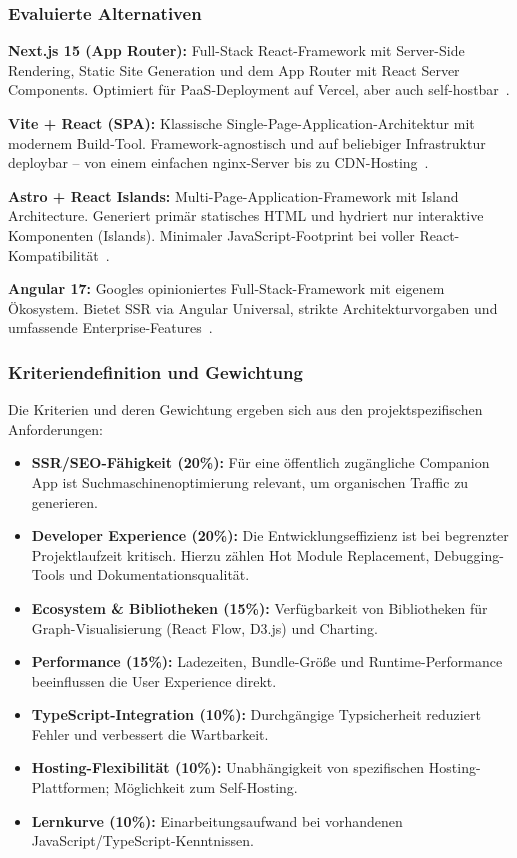 \subsubsection{Evaluierte Alternativen}

\textbf{Next.js 15 (App Router):} Full-Stack React-Framework mit Server-Side Rendering, Static Site Generation und dem App Router mit React Server Components. Optimiert für \ac{PaaS}-Deployment auf Vercel, aber auch self-hostbar~\cite{nextjsdocs2024}.

\textbf{Vite + React (SPA):} Klassische Single-Page-Application-Architektur mit modernem Build-Tool. Framework-agnostisch und auf beliebiger Infrastruktur deploybar – von einem einfachen nginx-Server bis zu \ac{CDN}-Hosting~\cite{vite2024}.

\textbf{Astro + React Islands:} Multi-Page-Application-Framework mit Island Architecture. Generiert primär statisches HTML und hydriert nur interaktive Komponenten (\glqq Islands\grqq{}). Minimaler JavaScript-Footprint bei voller React-Kompatibilität~\cite{astro2024}.

\textbf{Angular 17:} Googles opinioniertes Full-Stack-Framework mit eigenem Ökosystem. Bietet SSR via Angular Universal, strikte Architekturvorgaben und umfassende Enterprise-Features~\cite{angular2024}.

\subsubsection{Kriteriendefinition und Gewichtung}

Die Kriterien und deren Gewichtung ergeben sich aus den projektspezifischen Anforderungen:

\begin{itemize}
    \item \textbf{SSR/SEO-Fähigkeit (20\%):} Für eine öffentlich zugängliche Companion App ist Suchmaschinenoptimierung relevant, um organischen Traffic zu generieren.
    \item \textbf{Developer Experience (20\%):} Die Entwicklungseffizienz ist bei begrenzter Projektlaufzeit kritisch. Hierzu zählen Hot Module Replacement, Debugging-Tools und Dokumentationsqualität.
    \item \textbf{Ecosystem \& Bibliotheken (15\%):} Verfügbarkeit von Bibliotheken für Graph-Visualisierung (React Flow, D3.js) und Charting.
    \item \textbf{Performance (15\%):} Ladezeiten, Bundle-Größe und Runtime-Performance beeinflussen die User Experience direkt.
    \item \textbf{TypeScript-Integration (10\%):} Durchgängige Typsicherheit reduziert Fehler und verbessert die Wartbarkeit.
    \item \textbf{Hosting-Flexibilität (10\%):} Unabhängigkeit von spezifischen Hosting-Plattformen; Möglichkeit zum Self-Hosting.
    \item \textbf{Lernkurve (10\%):} Einarbeitungsaufwand bei vorhandenen JavaScript/TypeScript-Kenntnissen.
\end{itemize}

